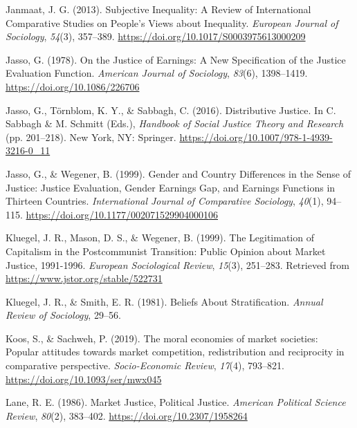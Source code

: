 \documentclass[
  13pt,
]{article}
\newlength{\cslhangindent}
\newenvironment{CSLReferences}[2] %
 {\begin{list}{}{%
  \setlength{\itemindent}{0pt}
  \setlength{\leftmargin}{0pt}
  \setlength{\parsep}{0pt}
  \ifodd #1
   \setlength{\leftmargin}{\cslhangindent}
   \setlength{\itemindent}{-1\cslhangindent}
  \fi
  \setlength{\itemsep}{#2\baselineskip}}}
 {\end{list}}
\begin{document}
\begin{CSLReferences}{1}{0}
Janmaat, J. G. (2013). Subjective {Inequality}: A {Review} of
{International Comparative Studies} on {People}'s {Views} about
{Inequality}. \emph{European Journal of Sociology}, \emph{54}(3),
357--389. \url{https://doi.org/10.1017/S0003975613000209}

Jasso, G. (1978). On the {Justice} of {Earnings}: {A New Specification}
of the {Justice Evaluation Function}. \emph{American Journal of
Sociology}, \emph{83}(6), 1398--1419.
\url{https://doi.org/10.1086/226706}

Jasso, G., Törnblom, K. Y., \& Sabbagh, C. (2016). Distributive
{Justice}. In C. Sabbagh \& M. Schmitt (Eds.), \emph{Handbook of {Social
Justice Theory} and {Research}} (pp. 201--218). New York, NY: Springer.
\url{https://doi.org/10.1007/978-1-4939-3216-0_11}

Jasso, G., \& Wegener, B. (1999). Gender and {Country Differences} in
the {Sense} of {Justice}: {Justice Evaluation}, {Gender Earnings Gap},
and {Earnings Functions} in {Thirteen Countries}. \emph{International
Journal of Comparative Sociology}, \emph{40}(1), 94--115.
\url{https://doi.org/10.1177/002071529904000106}

Kluegel, J. R., Mason, D. S., \& Wegener, B. (1999). The {Legitimation}
of {Capitalism} in the {Postcommunist Transition}: {Public Opinion}
about {Market Justice}, 1991-1996. \emph{European Sociological Review},
\emph{15}(3), 251--283. Retrieved from
\url{https://www.jstor.org/stable/522731}

Kluegel, J. R., \& Smith, E. R. (1981). Beliefs {About Stratification}.
\emph{Annual Review of Sociology}, 29--56.

Koos, S., \& Sachweh, P. (2019). The moral economies of market
societies: Popular attitudes towards market competition, redistribution
and reciprocity in comparative perspective. \emph{Socio-Economic
Review}, \emph{17}(4), 793--821.
\url{https://doi.org/10.1093/ser/mwx045}

Lane, R. E. (1986). Market {Justice}, {Political Justice}.
\emph{American Political Science Review}, \emph{80}(2), 383--402.
\url{https://doi.org/10.2307/1958264}


\end{CSLReferences}
\end{document}
